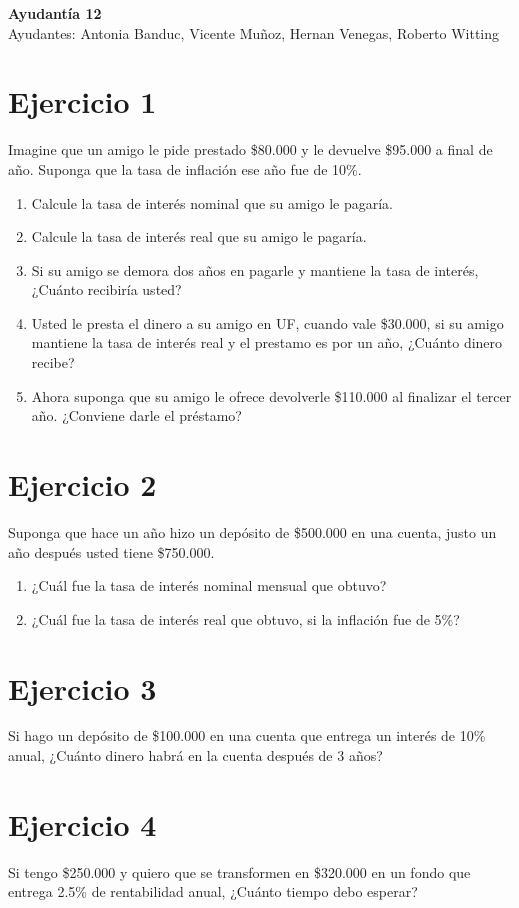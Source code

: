 \documentclass[11pt,letterpaper]{article}
\begin{document}
\begin{center}
    \textbf{\Large{Ayudantía 12}}\\
    Ayudantes: Antonia Banduc, Vicente Muñoz, Hernan Venegas, Roberto Witting
\end{center}


\section*{Ejercicio 1}
Imagine que un amigo le pide prestado \$80.000 y le devuelve \$95.000 a final de año. Suponga que la tasa de inflación ese año fue de 10\%.
\begin{enumerate}
    \item Calcule la tasa de interés nominal que su amigo le pagaría.
\item Calcule la tasa de interés real que su amigo le pagaría.
\item Si su amigo se demora dos años en pagarle y mantiene la tasa de interés, ¿Cuánto recibiría usted?
\item  Usted le presta el dinero a su amigo en UF, cuando vale \$30.000, si su amigo mantiene la tasa de
interés real y el prestamo es por un año, ¿Cuánto dinero recibe?
\item Ahora suponga que su amigo le ofrece devolverle \$110.000 al finalizar el tercer año. ¿Conviene darle
el préstamo?
\end{enumerate}

\section*{Ejercicio 2}
Suponga que hace un año hizo un depósito de \$500.000 en una cuenta, justo un año después usted tiene
\$750.000.
\begin{enumerate}
    \item ¿Cuál fue la tasa de interés nominal mensual que obtuvo?
    \item ¿Cuál fue la tasa de interés real que obtuvo, si la inflación fue de 5\%?
\end{enumerate}

\section*{Ejercicio 3}
Si hago un depósito de \$100.000 en una cuenta que entrega un interés de 10\% anual, ¿Cuánto dinero habrá en la cuenta después de 3 años?

\section*{Ejercicio 4}
Si tengo \$250.000 y quiero que se transformen en \$320.000 en un fondo que entrega 2.5\% de rentabilidad anual, ¿Cuánto tiempo debo esperar?
\end{document}
